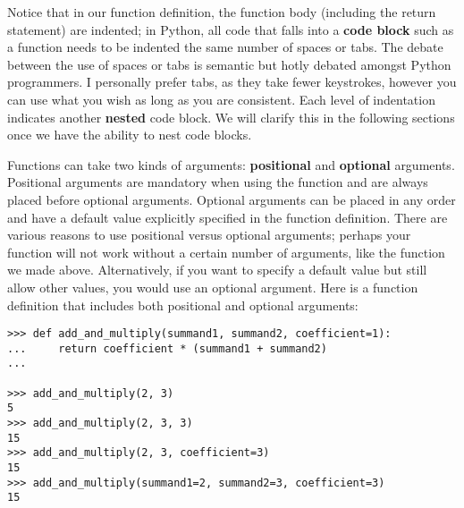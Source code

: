 \documentclass[a4paper,11pt]{article}
\begin{document}
Notice that in our function definition, the function body (including the return statement) are indented; in 
Python, all code that falls into a \textbf{code block} such as a function needs to be indented the same number
of spaces or tabs.  The debate between the use of spaces or tabs is semantic but hotly debated amongst Python 
programmers.  I personally prefer tabs, as they take fewer keystrokes, however you can use what you wish as 
long as you are consistent.  Each level of indentation indicates another \textbf{nested} code block.  We 
will clarify this in the following sections once we have the ability to nest code blocks.  \par
Functions can take two kinds of arguments: \textbf{positional} and \textbf{optional} arguments.  Positional 
arguments are mandatory when using the function and are always placed before optional arguments.  Optional
arguments can be placed in any order and have a default value explicitly specified in the function definition.  
There are various reasons to use positional versus optional arguments; perhaps your function will not work 
without a certain number of arguments, like the function we made above.  Alternatively, if you want to specify 
a default value but still allow other values, you would use an optional argument.  Here is a function definition 
that includes both positional and optional arguments:

\vspace{3mm}
\begin{lstlisting}
>>> def add_and_multiply(summand1, summand2, coefficient=1):
...     return coefficient * (summand1 + summand2)
... 

>>> add_and_multiply(2, 3)
5
>>> add_and_multiply(2, 3, 3)
15
>>> add_and_multiply(2, 3, coefficient=3)
15
>>> add_and_multiply(summand1=2, summand2=3, coefficient=3)
15
\end{lstlisting}
\vspace{3mm}
\end{document}
